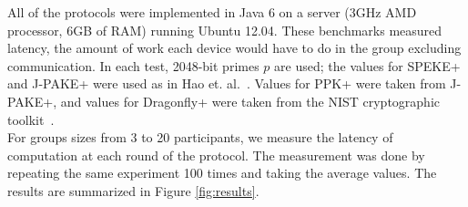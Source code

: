 All of the protocols were implemented in Java 6 on a server (3GHz AMD processor, 6GB of RAM) running Ubuntu 12.04. These
benchmarks measured latency, the amount of work each device would have to do in the group excluding communication.
In each test, 2048-bit primes $p$ are used; the values for SPEKE+ and J-PAKE+ were used as in Hao et. al.~\cite{HaYiChSh15}.
Values for PPK+ were taken from J-PAKE+, and values for Dragonfly+ were taken from the NIST cryptographic toolkit~\cite{NIST}.
\\

For groups sizes from 3 to 20 participants, we measure the latency of computation at each round of the protocol. The measurement
was done by repeating the same experiment 100 times and taking the average values. The results are summarized in Figure \ref{fig:results}.

